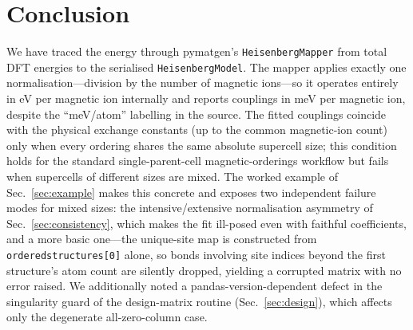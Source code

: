 \documentclass[11pt]{article}
\newcommand{\code}[1]{\texttt{\def\_{\textunderscore\allowbreak}#1}}
\begin{document}
\section{Conclusion}

We have traced the energy through pymatgen's \code{HeisenbergMapper} from total
DFT energies to the serialised \code{HeisenbergModel}. The mapper applies exactly
one normalisation---division by the number of magnetic ions---so it operates
entirely in eV per magnetic ion internally and reports couplings in meV per
magnetic ion, despite the ``meV/atom'' labelling in the source. The fitted
couplings coincide with the physical exchange constants (up to the common
magnetic-ion count) only when every ordering shares the same absolute supercell
size; this condition holds for the standard single-parent-cell magnetic-orderings
workflow but fails when supercells of different sizes are mixed. The worked
example of Sec.~\ref{sec:example} makes this concrete and exposes two independent
failure modes for mixed sizes: the intensive/extensive normalisation asymmetry of
Sec.~\ref{sec:consistency}, which makes the fit ill-posed even with faithful
coefficients, and a more basic one---the unique-site map is constructed from
\code{ordered\_structures[0]} alone, so bonds involving site indices beyond the
first structure's atom count are silently dropped, yielding a corrupted matrix
with no error raised. We additionally noted a pandas-version-dependent defect in
the singularity guard of the design-matrix routine (Sec.~\ref{sec:design}), which
affects only the degenerate all-zero-column case.
\end{document}
